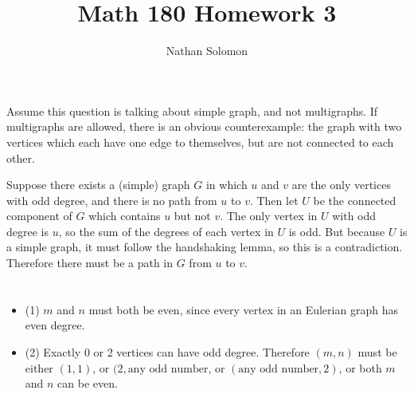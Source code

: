 \documentclass[12pt]{article}
\begin{document}
\title{Math 180 Homework 3}
\author{Nathan Solomon}
\maketitle

\section{}
\noindent{}\bigskip\par
Assume this question is talking about simple graph, and not multigraphs. If multigraphs are allowed, there is an obvious counterexample: the graph with two vertices which each have one edge to themselves, but are not connected to each other.
\par
Suppose there exists a (simple) graph $G$ in which $u$ and $v$ are the only vertices with odd degree, and there is no path from $u$ to $v$. Then let $U$ be the connected component of $G$ which contains $u$ but not $v$. The only vertex in $U$ with odd degree is $u$, so the sum of the degrees of each vertex in $U$ is odd. But because $U$ is a simple graph, it must follow the handshaking lemma, so this is a contradiction. Therefore there must be a path in $G$ from $u$ to $v$.

\section{}
\noindent{}\bigskip\par
\begin{itemize}
    \item (1) $m$ and $n$ must both be even, since every vertex in an Eulerian graph has even degree.
    \item (2) Exactly 0 or 2 vertices can have odd degree. Therefore $(m,n)$ must be either $(1,1)$, or $(2,\text{any odd number}$, or $(\text{any odd number},2)$, or both $m$ and $n$ can be even.
\end{itemize}
\end{document}
